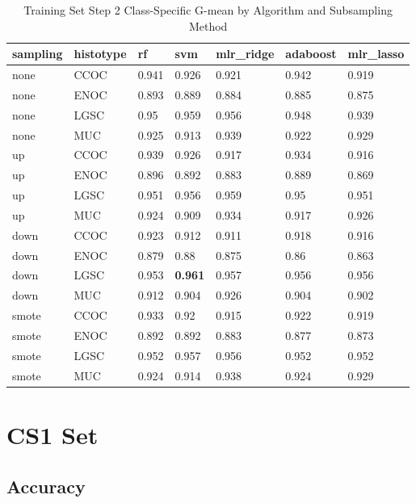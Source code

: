 \documentclass[
]{report}
\begin{document}
\begin{table}

\caption{\label{tab:train-step2-gmean-class-table}Training Set Step 2 Class-Specific G-mean by Algorithm and Subsampling Method}
\centering
\begin{tabular}[t]{l|l|l|l|l|l|l}
\hline
sampling & histotype & rf & svm & mlr\_ridge & adaboost & mlr\_lasso\\
\hline
none & CCOC & 0.941 & 0.926 & 0.921 & 0.942 & 0.919\\
\hline
none & ENOC & 0.893 & 0.889 & 0.884 & 0.885 & 0.875\\
\hline
none & LGSC & 0.95 & 0.959 & 0.956 & 0.948 & 0.939\\
\hline
none & MUC & 0.925 & 0.913 & 0.939 & 0.922 & 0.929\\
\hline
up & CCOC & 0.939 & 0.926 & 0.917 & 0.934 & 0.916\\
\hline
up & ENOC & 0.896 & 0.892 & 0.883 & 0.889 & 0.869\\
\hline
up & LGSC & 0.951 & 0.956 & 0.959 & 0.95 & 0.951\\
\hline
up & MUC & 0.924 & 0.909 & 0.934 & 0.917 & 0.926\\
\hline
down & CCOC & 0.923 & 0.912 & 0.911 & 0.918 & 0.916\\
\hline
down & ENOC & 0.879 & 0.88 & 0.875 & 0.86 & 0.863\\
\hline
down & LGSC & 0.953 & \textbf{0.961} & 0.957 & 0.956 & 0.956\\
\hline
down & MUC & 0.912 & 0.904 & 0.926 & 0.904 & 0.902\\
\hline
smote & CCOC & 0.933 & 0.92 & 0.915 & 0.922 & 0.919\\
\hline
smote & ENOC & 0.892 & 0.892 & 0.883 & 0.877 & 0.873\\
\hline
smote & LGSC & 0.952 & 0.957 & 0.956 & 0.952 & 0.952\\
\hline
smote & MUC & 0.924 & 0.914 & 0.938 & 0.924 & 0.929\\
\hline
\end{tabular}
\end{table}

\hypertarget{cs1-set}{%
\section{CS1 Set}\label{cs1-set}}

\hypertarget{accuracy-2}{%
\subsection{Accuracy}\label{accuracy-2}}
\end{document}
